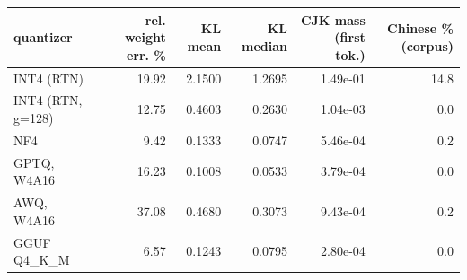 \begin{tabular}{@{}l r r r r r@{}}
\toprule
quantizer & rel. weight err. \% & KL mean & KL median & CJK mass (first tok.) & Chinese \% (corpus) \\
\midrule
INT4 (RTN) & 19.92 & 2.1500 & 1.2695 & 1.49e-01 & 14.8 \\
INT4 (RTN, g=128) & 12.75 & 0.4603 & 0.2630 & 1.04e-03 & 0.0 \\
NF4 & 9.42 & 0.1333 & 0.0747 & 5.46e-04 & 0.2 \\
GPTQ, W4A16 & 16.23 & 0.1008 & 0.0533 & 3.79e-04 & 0.0 \\
AWQ, W4A16 & 37.08 & 0.4680 & 0.3073 & 9.43e-04 & 0.2 \\
GGUF Q4_K_M & 6.57 & 0.1243 & 0.0795 & 2.80e-04 & 0.0 \\
\bottomrule
\end{tabular}

